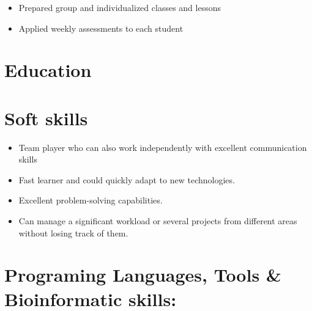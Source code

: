\documentclass[11pt,a4paper,]{awesome-cv}
\providecommand{\tightlist}{%
	\setlength{\itemsep}{0pt}\setlength{\parskip}{0pt}}
\begin{document}
\begin{itemize}
\tightlist
\item
  Prepared group and individualized classes and lessons
\item
  Applied weekly assessments to each student
\end{itemize}

\hypertarget{education}{%
\section{Education}\label{education}}

\begin{cventries}
    \vspace{-4.0mm}
\end{cventries}

\begin{cventries}
    \vspace{-4.0mm}
\end{cventries}

\begin{cventries}
    \vspace{-4.0mm}
\end{cventries}

\hypertarget{soft-skills}{%
\section{Soft skills}\label{soft-skills}}

\begin{itemize}
\tightlist
\item
  Team player who can also work independently with excellent
  communication skills
\item
  Fast learner and could quickly adapt to new technologies.
\item
  Excellent problem-solving capabilities.
\item
  Can manage a significant workload or several projects from different
  areas without losing track of them.
\end{itemize}

\hypertarget{programing-languages-tools-bioinformatic-skills}{%
\section{Programing Languages, Tools \& Bioinformatic
skills:}\label{programing-languages-tools-bioinformatic-skills}}
\end{document}
